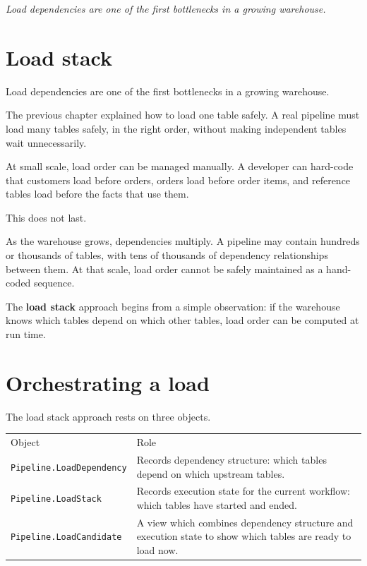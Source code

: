 \documentclass[10pt,openany,10pt]{book}
\newcounter{none}
\let\podeToprule\toprule
\let\podeMidrule\midrule
\let\podeBottomrule\bottomrule
\renewcommand{\toprule}{\arrayrulecolor{pbiGrid}\podeToprule}
\renewcommand{\midrule}{\arrayrulecolor{pbiGrid}\podeMidrule}
\renewcommand{\bottomrule}{\arrayrulecolor{pbiGrid}\podeBottomrule}
\begin{document}
\emph{Load dependencies are one of the first bottlenecks in a growing
warehouse.}

\section{Load stack}\label{load-stack}

Load dependencies are one of the first bottlenecks in a growing
warehouse.

The previous chapter explained how to load one table safely. A real
pipeline must load many tables safely, in the right order, without
making independent tables wait unnecessarily.

At small scale, load order can be managed manually. A developer can
hard-code that customers load before orders, orders load before order
items, and reference tables load before the facts that use them.

This does not last.

As the warehouse grows, dependencies multiply. A pipeline may contain
hundreds or thousands of tables, with tens of thousands of dependency
relationships between them. At that scale, load order cannot be safely
maintained as a hand-coded sequence.

The \textbf{load stack} approach begins from a simple observation: if
the warehouse knows which tables depend on which other tables, load
order can be computed at run time.

\section{Orchestrating a load}\label{orchestrating-a-load}

The load stack approach rests on three objects.

{\def\LTcaptype{none} %
\begin{longtable}[]{@{}
  >{\raggedright\arraybackslash}p{}
  >{\raggedright\arraybackslash}p{}@{}}
\toprule\noalign{}
\begin{minipage}[b]{\linewidth}\raggedright
Object
\end{minipage} & \begin{minipage}[b]{\linewidth}\raggedright
Role
\end{minipage} \\
\midrule\noalign{}
\endhead
\bottomrule\noalign{}
\endlastfoot
\texttt{Pipeline.LoadDependency} & Records dependency structure: which
tables depend on which upstream tables. \\
\texttt{Pipeline.LoadStack} & Records execution state for the current
workflow: which tables have started and ended. \\
\texttt{Pipeline.LoadCandidate} & A view which combines dependency
structure and execution state to show which tables are ready to load
now. \\
\end{longtable}
}
\end{document}
